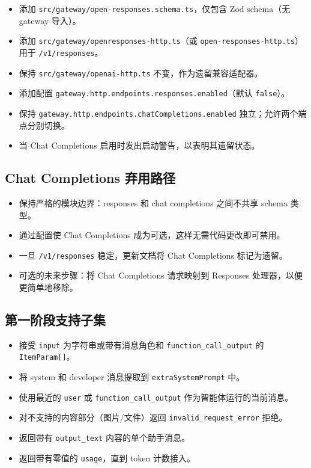 \begin{itemize}
  \item 添加 \texttt{src/gateway/open-responses.schema.ts}，仅包含 Zod schema（无 gateway 导入）。
  \item 添加 \texttt{src/gateway/openresponses-http.ts}（或 \texttt{open-responses-http.ts}）用于 \texttt{/v1/responses}。
  \item 保持 \texttt{src/gateway/openai-http.ts} 不变，作为遗留兼容适配器。
  \item 添加配置 \texttt{gateway.http.endpoints.responses.enabled}（默认 \texttt{false}）。
  \item 保持 \texttt{gateway.http.endpoints.chatCompletions.enabled} 独立；允许两个端点分别切换。
  \item 当 Chat Completions 启用时发出启动警告，以表明其遗留状态。
\end{itemize}


\subsection{Chat Completions 弃用路径}


\begin{itemize}
  \item 保持严格的模块边界：responses 和 chat completions 之间不共享 schema 类型。
  \item 通过配置使 Chat Completions 成为可选，这样无需代码更改即可禁用。
  \item 一旦 \texttt{/v1/responses} 稳定，更新文档将 Chat Completions 标记为遗留。
  \item 可选的未来步骤：将 Chat Completions 请求映射到 Responses 处理器，以便更简单地移除。
\end{itemize}


\subsection{第一阶段支持子集}


\begin{itemize}
  \item 接受 \texttt{input} 为字符串或带有消息角色和 \texttt{function\_call\_output} 的 \texttt{ItemParam[]}。
  \item 将 system 和 developer 消息提取到 \texttt{extraSystemPrompt} 中。
  \item 使用最近的 \texttt{user} 或 \texttt{function\_call\_output} 作为智能体运行的当前消息。
  \item 对不支持的内容部分（图片/文件）返回 \texttt{invalid\_request\_error} 拒绝。
  \item 返回带有 \texttt{output\_text} 内容的单个助手消息。
  \item 返回带有零值的 \texttt{usage}，直到 token 计数接入。
\end{itemize}


